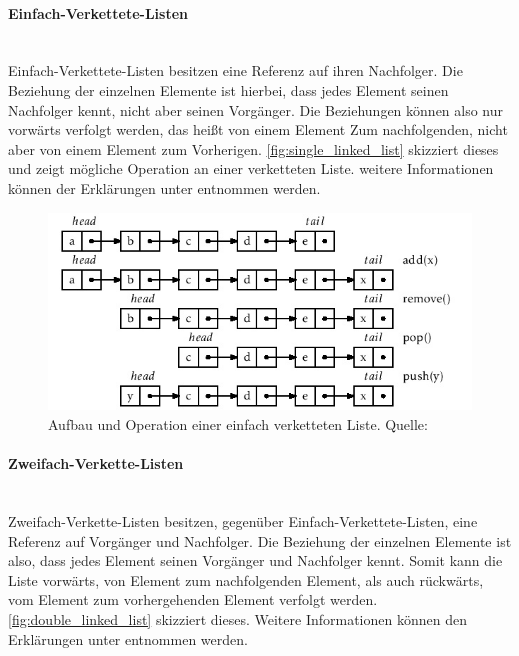 \documentclass[a4paper]{article}
\begin{document}
	\paragraph{Einfach-Verkettete-Listen}\mbox{} \\
	
	Einfach-Verkettete-Listen besitzen eine Referenz auf ihren Nachfolger.
	Die Beziehung der einzelnen Elemente ist hierbei, dass jedes Element
	seinen Nachfolger kennt, nicht aber seinen Vorgänger. Die Beziehungen
	können also nur vorwärts verfolgt werden, das heißt von einem Element
	Zum nachfolgenden, nicht aber von einem Element zum Vorherigen.
	\autoref{fig:single_linked_list} skizziert dieses und zeigt mögliche
	Operation an einer verketteten Liste. weitere Informationen können
	der Erklärungen unter \cite{SLList} entnommen werden.
	
	\begin{figure}[H] 
		\includegraphics[width=\linewidth]{../Bilder/single_linked_list.jpg}
		\caption
		{
			Aufbau und Operation einer einfach verketteten Liste.
			Quelle: \cite{SLList}
		}
		\label{fig:single_linked_list}
	\end{figure}	
	
	\paragraph{Zweifach-Verkette-Listen}\mbox{} \\
	
	Zweifach-Verkette-Listen besitzen, gegenüber Einfach-Verkettete-Listen,
	eine Referenz auf Vorgänger und Nachfolger. Die Beziehung der einzelnen
	Elemente ist also, dass jedes Element seinen Vorgänger und Nachfolger
	kennt. Somit kann die Liste vorwärts, von Element zum nachfolgenden
	Element, als auch rückwärts, vom Element zum vorhergehenden Element
	verfolgt werden. \autoref{fig:double_linked_list} skizziert dieses.
	Weitere Informationen können den Erklärungen unter \cite{DLList} entnommen
	werden.
	
\end{document}
